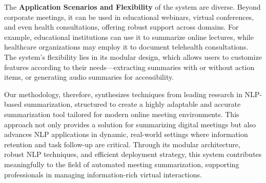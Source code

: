 \documentclass{article}
\begin{document}
The \textbf{Application Scenarios and Flexibility} of the system are diverse. Beyond corporate meetings, it can be used in educational webinars, virtual conferences, and even health consultations, offering robust support across domains. For example, educational institutions can use it to summarize online lectures, while healthcare organizations may employ it to document telehealth consultations. The system’s flexibility lies in its modular design, which allows users to customize features according to their needs—extracting summaries with or without action items, or generating audio summaries for accessibility.

Our methodology, therefore, synthesizes techniques from leading research in NLP-based summarization, structured to create a highly adaptable and accurate summarization tool tailored for modern online meeting environments. This approach not only provides a solution for summarizing digital meetings but also advances NLP applications in dynamic, real-world settings where information retention and task follow-up are critical. Through its modular architecture, robust NLP techniques, and efficient deployment strategy, this system contributes meaningfully to the field of automated meeting summarization, supporting professionals in managing information-rich virtual interactions.

\newpage
\clearpage


\renewcommand{\arraystretch}{1.5} %
\end{document}
